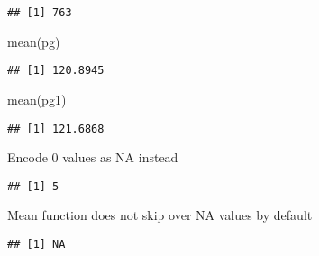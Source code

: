 \documentclass[
]{article}
\newenvironment{Shaded}{\begin{snugshade}}{\end{snugshade}}
\newcommand{\AttributeTok}[1]{\textcolor[rgb]{0.77,0.63,0.00}{#1}}
\newcommand{\ConstantTok}[1]{\textcolor[rgb]{0.00,0.00,0.00}{#1}}
\newcommand{\DecValTok}[1]{\textcolor[rgb]{0.00,0.00,0.81}{#1}}
\newcommand{\FunctionTok}[1]{\textcolor[rgb]{0.00,0.00,0.00}{#1}}
\newcommand{\NormalTok}[1]{#1}
\newcommand{\OtherTok}[1]{\textcolor[rgb]{0.56,0.35,0.01}{#1}}
\newcommand{\SpecialCharTok}[1]{\textcolor[rgb]{0.00,0.00,0.00}{#1}}
\begin{document}
\begin{verbatim}
## [1] 763
\end{verbatim}

\begin{Shaded}
\begin{Highlighting}[]
\FunctionTok{mean}\NormalTok{(pg)}
\end{Highlighting}
\end{Shaded}

\begin{verbatim}
## [1] 120.8945
\end{verbatim}

\begin{Shaded}
\begin{Highlighting}[]
\FunctionTok{mean}\NormalTok{(pg1)}
\end{Highlighting}
\end{Shaded}

\begin{verbatim}
## [1] 121.6868
\end{verbatim}

Encode 0 values as NA instead

\begin{Shaded}
\end{Shaded}

\begin{verbatim}
## [1] 5
\end{verbatim}

Mean function does not skip over NA values by default

\begin{Shaded}
\end{Shaded}

\begin{verbatim}
## [1] NA
\end{verbatim}

\begin{Shaded}
\end{Shaded}
\end{document}
